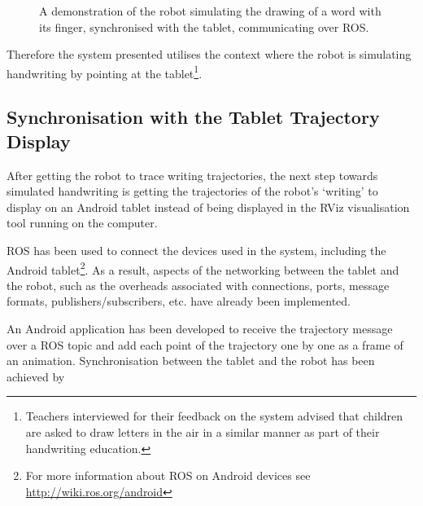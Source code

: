 \documentclass{sig-alternate}
\begin{document}
\begin{figure}[thpb]
     \begin{center}
%
    \end{center}
    \caption{A demonstration of the robot simulating the drawing of a word
        with its finger, synchronised with the tablet, communicating over ROS.
     }%

   \label{fig:naoWriting}
\end{figure}

Therefore the system presented utilises the context where the robot is
simulating handwriting by pointing at the tablet\footnote{Teachers interviewed
for their feedback on the system advised that children are asked to draw letters
in the air in a similar manner as part of their handwriting education.}.

\subsection{Synchronisation with the Tablet Trajectory Display}

After getting the robot to trace writing trajectories, the next step towards
simulated handwriting is getting the trajectories of the robot's `writing' to
display on an Android tablet instead of being displayed in the RViz
visualisation tool running on the computer. 

ROS has been used to connect the devices used in the system, including the
Android tablet\footnote{For more information about ROS on Android devices see
\url{http://wiki.ros.org/android}}. As a result, aspects of the networking
between the tablet and the robot, such as the overheads associated with
connections, ports, message formats, publishers/subscribers, etc. have already
been implemented. 

An Android application has been developed to receive the trajectory message over
a ROS topic and add each point of the trajectory one by one as a frame of an
animation. Synchronisation between the tablet and the robot has been achieved by
\end{document}

